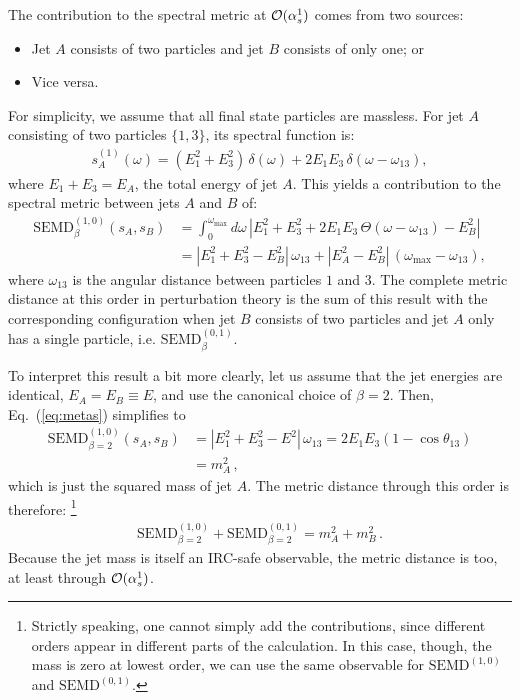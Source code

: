 \documentclass[letterpaper,11pt]{article}
\DeclareRobustCommand{\Eq}[1]{Eq.~(\ref{#1})}
\begin{document}
The contribution to the spectral metric at ${\cal O}(\alpha_s^1)$ comes from two sources:
%
\begin{itemize}
\item Jet $A$ consists of two particles and jet $B$ consists of only one; or
\item Vice versa.
\end{itemize}
%
For simplicity, we assume that all final state particles are massless.
%
For jet $A$ consisting of two particles $\{1,3\}$, its spectral function is:
%
\begin{align}
\label{eq:specA_1}
s^{(1)}_A(\omega) = (E_1^2+E_3^2)\,\delta(\omega) + 2E_1E_3\,\delta\left(\omega-\omega_{13}\right),
\end{align}
%
where $E_1+E_3 = E_A$, the total energy of jet $A$.
%
This yields a contribution to the spectral metric between jets $A$ and $B$ of:
%
\begin{align}
\label{eq:metas}
\text{SEMD}^{(1,0)}_{\beta}(s_A, s_B) &= \int_0^{\omega_{\max}} d\omega\, \left|
E_1^2+E_3^2+2E_1E_3\,\Theta\left(\omega-\omega_{13}\right) - E_B^2
\right| \\
&=|E_1^2+E_3^2 - E_B^2|\, \omega_{13}+|E_A^2-E_B^2|\,(\omega_{\max}-\omega_{13}), \nonumber
\end{align}
%
where $\omega_{13}$ is the angular distance between particles $1$ and $3$.
%
The complete metric distance at this order in perturbation theory is the sum of this result with the corresponding configuration when jet $B$ consists of two particles and jet $A$ only has a single particle, i.e. $\text{SEMD}^{(0,1)}_{\beta}$.



To interpret this result a bit more clearly, let us assume that the jet energies are identical, $E_A=E_B\equiv E$, and use the canonical choice of $\beta = 2$.
%
Then, \Eq{eq:metas} simplifies to
\begin{align}
\label{eq:SEMD_mass}
\text{SEMD}^{(1,0)}_{\beta=2}(s_A, s_B) &= |E_1^2+E_3^2 - E^2|\, \omega_{13}=2E_1E_3\left( 1-\cos\theta_{13}\right)\\
&=m_A^2\,,\nonumber
\end{align}
which is just the squared mass of jet $A$.
%
The metric distance through this order is therefore:%
%
\footnote{Strictly speaking, one cannot simply add the contributions, since different orders appear in different parts of the calculation.  In this case, though, the mass is zero at lowest order, we can use the same observable for $\text{SEMD}^{(1,0)}$ and $\text{SEMD}^{(0,1)}$.}
%
\begin{align}
\text{SEMD}^{(1,0)}_{\beta=2} + \text{SEMD}^{(0,1)}_{\beta=2}  = m_A^2+m_B^2\,.
\end{align}
%
Because the jet mass is itself an IRC-safe observable,  the metric distance is too, at least through ${\cal O}(\alpha_s^1)$.
\end{document}
